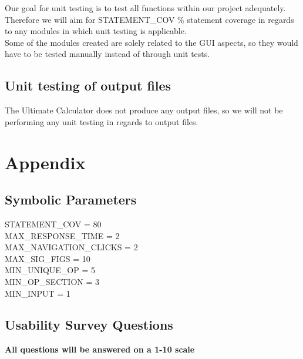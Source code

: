 \documentclass[12pt, titlepage]{article}
\begin{document}
\noindent{}Our goal for unit testing is to test all functions within our project adequately. Therefore we will aim for STATEMENT\_COV \% statement coverage in regards to any modules in which unit testing is applicable.\\

\noindent{}Some of the modules created are solely related to the GUI aspects, so they would have to be tested manually instead of through unit tests.
\subsection{Unit testing of output files}
The Ultimate Calculator does not produce any output files, so we will not be performing any unit testing in regards to output files.





\newpage

\section{Appendix}


\subsection{Symbolic Parameters}

STATEMENT\_COV = 80\\
MAX\_RESPONSE\_TIME = 2\\
MAX\_NAVIGATION\_CLICKS = 2\\
MAX\_SIG\_FIGS = 10\\
MIN\_UNIQUE\_OP = 5\\
MIN\_OP\_SECTION = 3\\
MIN\_INPUT = 1\\

\subsection{Usability Survey Questions}

\textbf{All questions will be answered on a 1-10 scale}
\end{document}
